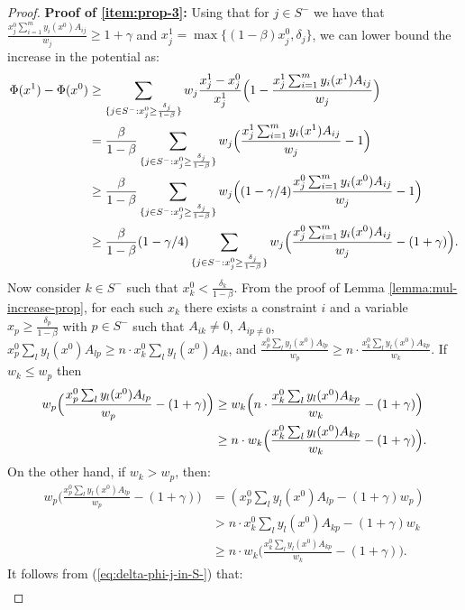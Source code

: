 \documentclass[11pt]{article}
\begin{document}
\begin{proof}
\noindent\textbf{Proof of \ref{item:prop-3}:} Using that for $j\in S^-$ we have that $\frac{x_j^0\sum_{i=1}^m y_i(x^0)A_{ij}}{w_j}\geq 1 + \gamma$ and $x_j^1 = \max\{(1-\beta)x_j^0, \delta_j\}$, we can lower bound the increase in the potential as:
\begin{align}
\Phi(x^1) - \Phi(x^0) &\geq \sum_{\{j\in S^-:x_j^0\geq \frac{\delta_j}{1-\beta}\}} w_j \frac{x_j^1 - x_j^0}{x_j^1}\Big(1 - \frac{x_j^1 \sum_{i=1}^m y_{i}(x^1)A_{ij}}{w_j}\Big)\notag\\
& = \frac{\beta}{1-\beta} \sum_{\{j\in S^-:x_j^0\geq \frac{\delta_j}{1-\beta}\}} w_j \Big(\frac{x_j^1 \sum_{i=1}^m y_i (x^1)A_{ij}}{w_j} - 1\Big)\notag\\
&\geq \frac{\beta}{1-\beta} \sum_{\{j\in S^-:x_j^0\geq \frac{\delta_j}{1-\beta}\}} w_j \Big((1-\gamma/4)\frac{x_j^0 \sum_{i=1}^m y_i(x^0)A_{ij}}{w_j} - 1\Big)\notag\\
&\geq \frac{\beta}{1-\beta}(1-\gamma/4) \sum_{\{j\in S^-:x_j^0\geq \frac{\delta_j}{1-\beta}\}} w_j\Big(\frac{x_j^0 \sum_{i=1}^m y_i(x^0)A_{ij}}{w_j} - (1+\gamma)\Big). \label{eq:delta-phi-j-in-S-}
\end{align}
Now consider $k\in S^-$ such that $x_k^0 < \frac{\delta_k}{1-\beta}$. From the proof of Lemma \ref{lemma:mul-increase-prop}, for each such $x_k$ there exists a constraint $i$ and a variable $x_p \geq \frac{\delta_p}{1-\beta}$ with $p\in S^-$ such that $A_{ik}\neq 0$, $A_{ip\neq 0}$, $x_p^0 \sum_l y_l(x^0)A_{lp}\geq n\cdot x_k^0 \sum_l y_l(x^0)A_{lk}$, and $\frac{x_p^0 \sum_l y_l(x^0)A_{lp}}{w_p}\geq n\cdot \frac{x_k^0 \sum_l y_l(x^0)A_{kp}}{w_k}$. If $w_k \leq w_p$ then
\begin{align}
w_p \Big( \frac{x_p^0 \sum_l y_l(x^0)A_{lp}}{w_p} - (1+\gamma) \Big)&\geq w_k  \Big(n\cdot \frac{x_k^0 \sum_l y_l(x^0)A_{kp}}{w_k} - (1+\gamma) \Big)\notag\\
&\geq n \cdot w_k  \Big( \frac{x_k^0 \sum_l y_l(x^0)A_{kp}}{w_k} - (1+\gamma) \Big)\notag.
\end{align}
On the other hand, if $w_k>w_p$, then:
\begin{align*}
w_p \Big( \frac{x_p^0 \sum_l y_l(x^0)A_{lp}}{w_p} - (1+\gamma) \Big)&= ( x_p^0 \sum_l y_l(x^0)A_{lp} - (1+\gamma)w_p )\\
&> n\cdot x_k^0 \sum_l y_l(x^0)A_{kp} - (1+\gamma)w_k\\
&\geq n\cdot w_k \Big( \frac{x_k^0 \sum_l y_l(x^0)A_{kp}}{w_k} - (1+\gamma) \Big).
\end{align*}
It follows from (\ref{eq:delta-phi-j-in-S-}) that:
\begin{align*}

\end{align*}
\end{proof}
\end{document}
